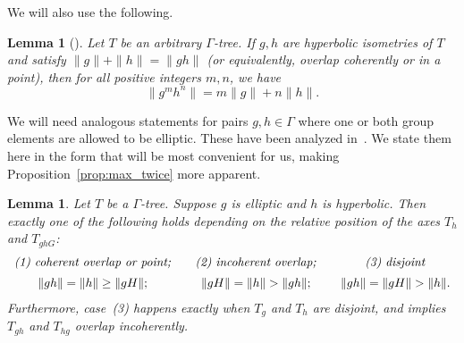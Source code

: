 \documentclass[11pt]{amsart}
\numberwithin{equation}{section}
\numberwithin{figure}{section}
\newtheorem{lemma}[theorem]{Lemma}
\theoremstyle{definition}
\theoremstyle{plain}
\begin{document}
We will also use the following.

\begin{lemma}[{\cite[Lemma~6.2]{CM87:GroupActions}}]\label{lem:powers_intersect}
    Let $T$ be an arbitrary $\Gamma$-tree.
    If $g,h$ are hyperbolic isometries of $T$ and satisfy $\|g\| + \|h\| = \|gh\|$ (or
    equivalently, overlap coherently or in a point), then for all positive integers $m,n$, we have
    \[
    \|g^m h^n\| = m \| g \| + n \|h \|.
    \]
\end{lemma}

We will need analogous statements for pairs $g,h \in \Gamma$ where one
or both group elements are allowed to be elliptic. These have been
analyzed in~\cite{Pa89:Paulin1989TheGT}. We state them here in the
form that will be most convenient for us, making
Proposition~\ref{prop:max_twice}
more
apparent.
\begin{lemma}\label{lem:pau_ell_hyp}
Let $T$ be a $\Gamma$-tree. Suppose $g$ is elliptic and $h$ is
hyperbolic. Then exactly one of the following holds depending on the
relative position of the axes $T_h$ and $T_{ghG}$:
\[ \begin{array}{c@{\qquad}c@{\qquad}c} \text{\emph{(1) coherent overlap or point;}} & \text{\emph{(2) incoherent overlap;}} & \text{\emph{(3) disjoint}} \\[1.2ex] \|gh\|=\|h\|\ge\|gH\|; & \|gH\|=\|h\|>\|gh\|; & \|gh\|=\|gH\|>\|h\|. \end{array} \]
Furthermore, case~(3) happens exactly when $T_g$ and $T_h$ are
disjoint, and implies $T_{gh}$ and $T_{hg}$ overlap incoherently.
\end{lemma}
\end{document}
